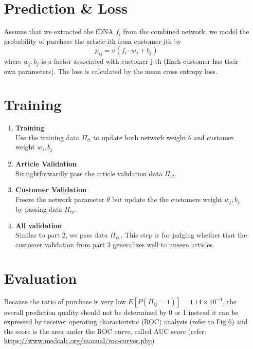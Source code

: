 \documentclass{article}
\begin{document}
\section*{Prediction \& Loss}
Assume that we extracted the fDNA $f_i$ from the combined network, we model the probability of purchase the article-ith from customer-jth by
\[p_{ij} = \sigma(f_i\cdot w_{j}+b_j)\]
where $w_j, b_j$ is a factor associated with customer j-th (Each customer has their own parameters).
The loss is calculated by the mean cross entropy loss.
\section*{Training}
\begin{enumerate}
\item {\bf Training}\\
Use the training data $\Pi_{tt}$ to update both network weight $\theta$ and customer weight $w_j, b_j$ 
\item {\bf Article Validation}\\
Straightforwardly pass the article validation data $\Pi_{vt}$.
\item {\bf Customer Validation}\\
Freeze the network parameter $\theta$ but update the the customers weight $w_j, b_j$ by passing data $\Pi_{tv}$.
\item {\bf All validation}\\
Similar to part 2, we pass data $\Pi_{vv}$. This step is for judging whether that the customer validation from part 3 generalizes well to unseen articles.
\end{enumerate}
\section*{Evaluation}
Because the ratio of purchase is very low $E[P(\Pi_{ij}=1)] = 1.14\times 10^{-4}$, the overall prediction quality should not be determined by 0 or 1 instead it can be expressed by receiver operating characteristic (ROC) analysis (refer to Fig 6) and the score is the area under the ROC curve, called AUC score (refer: \url{https://www.medcalc.org/manual/roc-curves.php})
\end{document}
